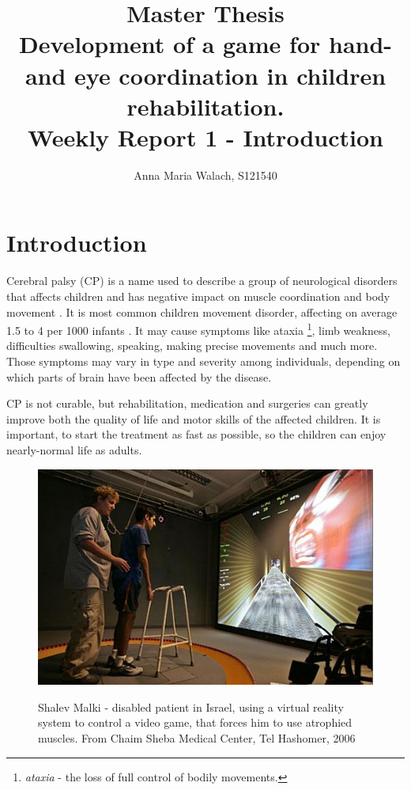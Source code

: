 \documentclass[10pt,a4paper]{article}
\title{{Master Thesis\\[0.5em]}
       {\bf \huge Development of a game for hand- and eye coordination in children rehabilitation.\\[0.5em]}
       {\bf Weekly Report 1 - Introduction }}
\author{Anna Maria Walach, S121540}
\begin{document}
\maketitle

\section*{Introduction }
Cerebral palsy (CP) is a name used to describe a group of neurological disorders that affects children and has negative impact on muscle coordination and body movement \cite{main_site}. It is most common children movement disorder, affecting on average 1.5 to 4 per 1000 infants \cite{stats}. It may cause symptoms like ataxia \footnote{\textit{ataxia} - the loss of full control of bodily movements.}, limb weakness, difficulties swallowing, speaking, making precise movements and much more. Those symptoms may vary in type and severity among individuals, depending on which parts of brain have been affected by the disease. 

CP is not curable, but rehabilitation, medication and surgeries can greatly improve both the quality of life and motor skills of the affected children. It is important, to start the treatment as fast as possible, so the children can enjoy nearly-normal life as adults.

\begin{figure}
\centering
\includegraphics[scale=0.8]{../images/rehab_example.JPG} 
\label{img:example}
\caption{Shalev Malki - disabled patient in Israel, using a virtual reality system to control a video game, that forces him to use atrophied muscles. From Chaim Sheba Medical Center, Tel Hashomer, 2006}
\end{figure}
\end{document}
